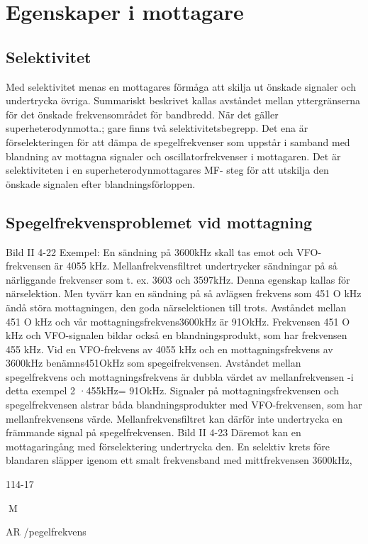 \section{Egenskaper i mottagare}

\subsection{Selektivitet}

Med selektivitet menas en mottagares förmåga att skilja ut önskade signaler och
undertrycka övriga. Summariskt beskrivet
kallas avståndet mellan yttergränserna för
det önskade frekvensområdet för bandbredd. När det gäller superheterodynmotta.;
gare finns två selektivitetsbegrepp.
Det ena är förselekteringen för att dämpa
de spegelfrekvenser som uppstår i samband med blandning av mottagna signaler
och oscillatorfrekvenser i mottagaren.
Det är selektiviteten i en superheterodynmottagares MF- steg för att utskilja den
önskade signalen efter blandningsförloppen.

\subsection{Spegelfrekvensproblemet vid mottagning}
Bild II 4-22
Exempel:
En sändning på 3600kHz skall tas emot och
VFO-frekvensen är 4055 kHz. Mellanfrekvensfiltret undertrycker sändningar på så
närliggande frekvenser som t. ex. 3603 och
3597kHz. Denna egenskap kallas för närselektion.
Men tyvärr kan en sändning på så avlägsen frekvens som 451 O kHz ändå störa
mottagningen, den goda närselektionen till
trots. Avståndet mellan 451 O kHz och vår
mottagningsfrekvens3600kHz är 91OkHz.
Frekvensen 451 O kHz och VFO-signalen
bildar också en blandningsprodukt, som har
frekvensen 455 kHz. Vid en VFO-frekvens
av 4055 kHz och en mottagningsfrekvens
av 3600kHz benämns451OkHz som spegeifrekvensen. Avståndet mellan spegelfrekvens och mottagningsfrekvens är dubbla
värdet av mellanfrekvensen -i detta exempel 2 ·455kHz= 91OkHz.
Signaler på mottagningsfrekvensen och
spegelfrekvensen alstrar båda blandningsprodukter med VFO-frekvensen, som har
mellanfrekvensens värde. Mellanfrekvensfiltret kan därför inte undertrycka en främmande signal på spegelfrekvensen.
Bild II 4-23
Däremot kan en mottagaringång med
förselektering undertrycka den. En selektiv
krets före blandaren släpper igenom ett smalt
frekvensband med mittfrekvensen 3600kHz,

114-17

M

AR
/pegelfrekvens

